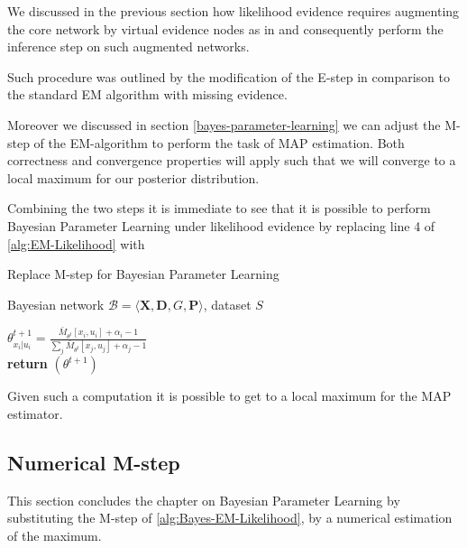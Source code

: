 \documentclass[11pt]{article}
\begin{document}
\begin{article}
We discussed in the previous section how likelihood evidence
requires augmenting the core network by virtual evidence nodes as
in \cite{pearl2014probabilistic} and consequently perform the
inference step on such augmented networks.

Such procedure was outlined by the modification of the E-step in
comparison to the standard EM algorithm with missing evidence.

Moreover we discussed in section \ref{bayes-parameter-learning} we
can adjust the M-step of the EM-algorithm to perform the task of
MAP estimation. Both correctness and convergence properties will
apply such that we will converge to a local maximum for our
posterior distribution.

Combining the two steps it is immediate to see that it is possible
to perform Bayesian Parameter Learning under likelihood evidence
by replacing line 4 of \ref{alg:EM-Likelihood} with 

\begin{algorithm*}[h!]
\caption{Replace M-step for Bayesian Parameter Learning}
\label{alg:Bayes-EM-Likelihood}
\vspace{-10pt}
\begin{multicols}{2}
\begin{algorithmic}[1] 
\Require Bayesian network $\mathcal{B}=\langle \mathbf{X},\mathbf{D}, G, \mathbf{P} \rangle$, dataset $S$ 

   \State $\theta_{x_{i}|u_{i}}^{t+1}=\frac{\bar{M}_{\theta^{t}}[x_{i},u_{i}] + \alpha_i - 1}{\sum_j \bar{M}_{\theta^{t}}[x_{j},u_{j}] + \alpha_j - 1}$\\
   
   \textbf{return} $(\theta^{t+1})$

\end{algorithmic}
\end{multicols}
\end{algorithm*}

Given such a computation it is possible to get to a local maximum
for the MAP estimator.

\subsection{Numerical M-step}
\label{sec:orgdbfcde4}

This section concludes the chapter on Bayesian Parameter Learning
by substituting the M-step of \ref{alg:Bayes-EM-Likelihood}, by a
numerical estimation of the maximum.


\end{article}
\end{document}

